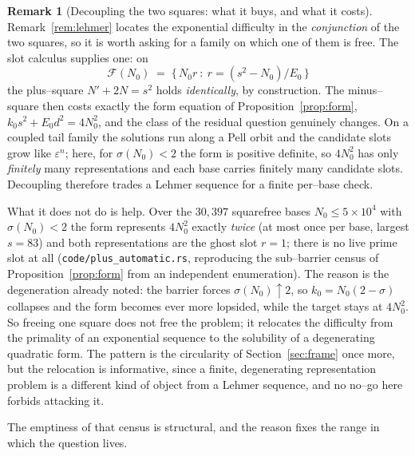 \documentclass[11pt]{article}
\theoremstyle{definition}
\newtheorem{remark}[theorem]{Remark}
\begin{document}
\begin{remark}[Decoupling the two squares: what it buys, and what it costs]\label{rem:decouple}
Remark~\ref{rem:lehmer} locates the exponential difficulty in the \emph{conjunction} of the two
squares, so it is worth asking for a family on which one of them is free. The slot calculus supplies
one: on
\[ \mathcal F(N_0)\;=\;\bigl\{\,N_0r\ :\ r=(s^2-N_0)/E_0\,\bigr\} \]
the plus--square $N'+2N=s^2$ holds \emph{identically}, by construction. The minus--square then costs
exactly the form equation of Proposition~\ref{prop:form}, $k_0s^2+E_0d^2=4N_0^2$, and the class of
the residual question genuinely changes. On a coupled tail family the solutions run along a Pell
orbit and the candidate slots grow like $\varepsilon^n$; here, for $\sigma(N_0)<2$ the form is
positive definite, so $4N_0^2$ has only \emph{finitely} many representations and each base carries
finitely many candidate slots. Decoupling therefore trades a Lehmer sequence for a finite
per--base check.

What it does not do is help. Over the $30{,}397$ squarefree bases $N_0\le5\times10^4$ with
$\sigma(N_0)<2$ the form represents $4N_0^2$ exactly \emph{twice} (at most once per base, largest
$s=83$) and both representations are the ghost slot $r=1$; there is no live prime slot at all
(\texttt{code/plus\_automatic.rs}, reproducing the sub--barrier census of
Proposition~\ref{prop:form} from an independent enumeration). The reason is the degeneration already
noted: the barrier forces $\sigma(N_0)\uparrow2$, so $k_0=N_0(2-\sigma)$ collapses and the form
becomes ever more lopsided, while the target stays at $4N_0^2$. So freeing one square does not free
the problem; it relocates the difficulty from the primality of an exponential sequence to the
solubility of a degenerating quadratic form. The pattern is the circularity of
Section~\ref{sec:frame} once more, but the relocation is informative, since a finite, degenerating
representation problem is a different kind of object from a Lehmer sequence, and no no--go here
forbids attacking it.
\end{remark}

The emptiness of that census is structural, and the reason fixes the range in which the question
lives.
\end{document}
